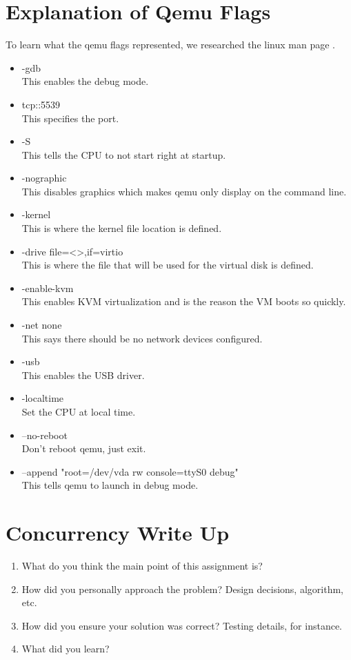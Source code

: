 \documentclass[letterpaper,10pt,draftclsnofoot,onecolumn,titlepage]{IEEEtran}
\begin{document}
\section{Explanation of Qemu Flags}
To learn what the qemu flags represented, we researched the linux man page \cite{Qemu-kvm}.
\begin{itemize}
\item -gdb \\
	This enables the debug mode. 
\item tcp::5539 \\
	This specifies the port.  
\item -S \\
	This tells the CPU to not start right at startup. 
\item -nographic \\
	This disables graphics which makes qemu only display on the command line. 
\item -kernel \\
	This is where the kernel file location is defined. 
\item -drive file=<>,if=virtio \\
	This is where the file that will be used for the virtual disk is defined. 
\item -enable-kvm \\
	This enables KVM virtualization and is the reason the VM boots so quickly. 
\item -net none \\
	This says there should be no network devices configured. 
\item -usb \\
	This enables the USB driver. 
\item -localtime \\
	Set the CPU at local time. 
\item --no-reboot \\
	Don't reboot qemu, just exit. 
\item --append "root=/dev/vda rw console=ttyS0 debug" \\
	This tells qemu to launch in debug mode.
\end{itemize}

\section{Concurrency Write Up}
\begin{enumerate}  
		\item What do you think the main point of this assignment is?
		\item How did you personally approach the problem? Design decisions, algorithm, etc.
		\item How did you ensure your solution was correct? Testing details, for instance.
		\item What did you learn?
 	\end{enumerate}
    
\end{document}
